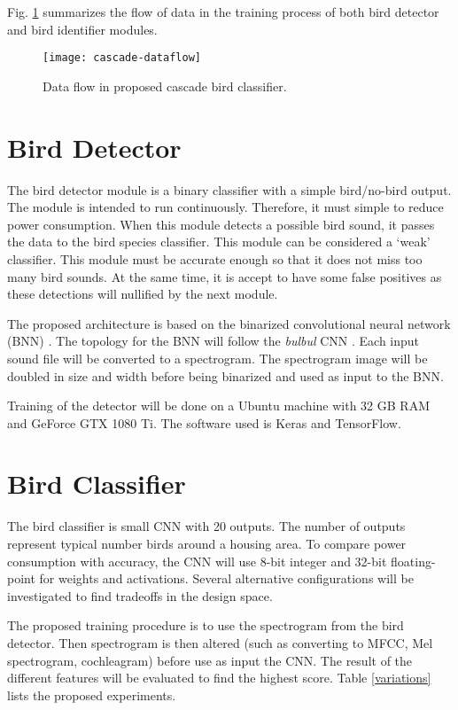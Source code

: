  Fig. \ref{cascade-dataflow} summarizes the flow of data in the training process of both bird detector and bird identifier modules.


\begin{figure}%
\centering
\texttt{[image: cascade-dataflow]}
\caption{Data flow in proposed cascade bird classifier.}
\label{cascade-dataflow}
\end{figure}


\FloatBarrier

\section{Bird Detector}

The bird detector module is a binary classifier with a simple bird/no-bird output.
The module is intended to run continuously. Therefore, it must simple to reduce power consumption.
When this module detects a possible bird sound,  it passes the data to the bird species classifier.
This module can be considered a `weak' classifier. 
This module must be accurate enough so that it does not miss too many bird sounds.
At the same time, it is accept to have some false positives as these detections will nullified by the next module.

The proposed architecture is based on the binarized convolutional neural network (BNN)  \cite{Courbariaux2015,Simons2019}.
The topology for the BNN will follow the \textit{bulbul} CNN \cite{Grill2017}.
Each input sound file will be converted to a spectrogram.
The spectrogram image will be doubled in size and width before being binarized and used as input to the BNN.

Training of the detector will be done on a Ubuntu machine with 32 GB RAM and GeForce GTX 1080 Ti.
The software used is Keras and TensorFlow.

\section{Bird Classifier}

The bird classifier is small CNN with 20 outputs.
The number of outputs represent typical number birds around a housing area.
To compare power consumption with accuracy, the CNN will use 8-bit integer and 32-bit floating-point for weights and activations.
Several alternative configurations will be investigated to find tradeoffs in the design space.

The proposed training procedure is to use the spectrogram from the bird detector.
Then spectrogram is then altered (such as converting to MFCC, Mel spectrogram, cochleagram) before use as input the CNN. The result of the different features will be evaluated to find the highest score. Table \ref{variations} lists the proposed experiments.

